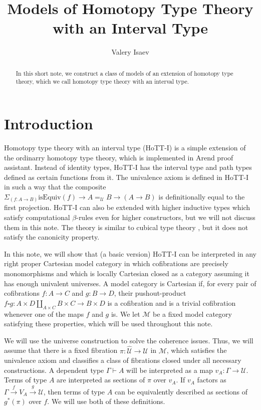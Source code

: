 \documentclass{amsart}
\theoremstyle{definition}
\theoremstyle{remark}
\newcommand{\U}{\mathcal{U}}
\newcommand{\hU}{\widehat{\mathcal{U}}}
\numberwithin{figure}{section}
\begin{document}
\title{Models of Homotopy Type Theory with an Interval Type}

\author{Valery Isaev}

\begin{abstract}
In this short note, we construct a class of models of an extension of homotopy type theory, which we call homotopy type theory with an interval type.
\end{abstract}

\maketitle

\section{Introduction}

Homotopy type theory with an interval type (HoTT-I) is a simple extension of the ordinarry homotopy type theory, which is implemented in Arend proof assistant.
Instead of identity types, HoTT-I has the interval type and path types defined as certain functions from it.
The univalence axiom is defined in HoTT-I in such a way that the composite $\Sigma_{(f : A \to B)} \mathrm{isEquiv}(f) \to A =_\mathcal{U} B \to (A \to B)$ is definitionally equal to the first projection.
HoTT-I can also be extended with higher inductive types which satisfy computational $\beta$-rules even for higher constructors, but we will not discuss them in this note.
The theory is similar to cubical type theory \cite{cubical-tt}, but it does not satisfy the canonicity property.

In this note, we will show that (a basic version) HoTT-I can be interpreted in any right proper Cartesian model category in which cofibrations are precisely monomorphisms and which is locally Cartesian closed as a category assuming it has enough univalent universes.
A model category is Cartesian if, for every pair of cofibrations $f : A \to C$ and $g : B \to D$, their pushout-product $f \square g : A \times D \amalg_{A \times C} B \times C \to B \times D$ is a cofibration and is a trivial cofibration whenever one of the maps $f$ and $g$ is.
We let $\mathcal{M}$ be a fixed model category satisfying these properties, which will be used throughout this note.

We will use the universe construction \cite{kap-lum-voe} to solve the coherence issues.
Thus, we will assume that there is a fixed fibration $\pi : \hU \to \U$ in $\mathcal{M}$, which satisfies the univalence axiom and classifies a class of fibrations closed under all necessary constructions.
A dependent type $\Gamma \vdash A$ will be interpreted as a map $v_A : \Gamma \to \U$.
Terms of type $A$ are interpreted as sections of $\pi$ over $v_A$.
If $v_A$ factors as $\Gamma \xrightarrow{f} V_A \xrightarrow{g} \U$, then terms of type $A$ can be equivalently described as sections of $g^*(\pi)$ over $f$.
We will use both of these definitions.
\end{document}
